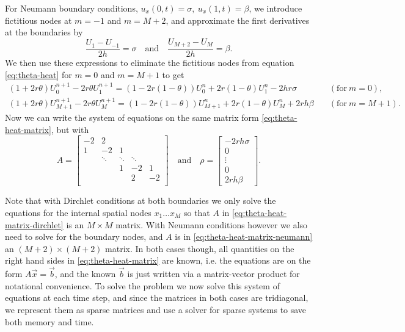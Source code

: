 For Neumann boundary conditions, $u_x(0, t) = \sigma, \: u_x(1, t) = \beta$, 
we introduce fictitious nodes at $m=-1$ and $m=M+2$, 
and approximate the first derivatives at the boundaries by
\begin{equation*}
    \frac{U_1 - U_{-1}}{2h} = \sigma
    \quad \text{and} \quad
    \frac{U_{M+2} - U_{M}}{2h} = \beta. 
\end{equation*}
We then use these expressions to eliminate the fictitious nodes from equation \eqref{eq:theta-heat} for $m=0$ and $m=M+1$ to get
\begin{align*}
    \left(1+2r\theta\right)U_0^{n+1} - 2r\theta U_1^{n+1} = \left(1-2r(1-\theta)\right)U_0^n + 2r\left(1-\theta\right)U_1^n - 2hr\sigma
    \quad & (\text{for} \: m=0), \\
    \left(1+2r\theta\right)U_{M+1}^{n+1} - 2r\theta U_M^{n+1} = \left(1-2r(1-\theta)\right)U_{M+1}^n + 2r\left(1-\theta\right)U_M^n + 2rh\beta
    \quad & (\text{for} \: m=M+1). 
\end{align*}
Now we can write the system of equations on the same matrix form \eqref{eq:theta-heat-matrix}, 
but with 
\begin{equation}
    A = 
    \begin{bmatrix}
    -2 & 2 \\
    1 & -2 & 1 & \\
      & \ddots & \ddots & \ddots & \\
      &   & 1 & -2 & 1 \\
      &   &  & 2 & -2 \\
    \end{bmatrix}
    \quad \text{and} \quad
    \rho = 
    \begin{bmatrix}
        -2rh\sigma \\ 0 \\ \vdots \\ 0 \\ 2rh\beta
    \end{bmatrix}
    .
    \label{eq:theta-heat-matrix-neumann}
\end{equation}

Note that with Dirchlet conditions at both boundaries we only solve the equations for the internal spatial nodes $x_1 \dots x_M$ so that $A$ in \eqref{eq:theta-heat-matrix-dirchlet} is an $M \times M$ matrix. 
With Neumann conditions however we also need to solve for the boundary nodes, 
and $A$ is in \eqref{eq:theta-heat-matrix-neumann} an $(M+2) \times (M+2)$ matrix. 
In both cases though, all quantities on the right hand sides in \eqref{eq:theta-heat-matrix} are known, 
i.e. the equations are on the form $A\vec{x}=\vec{b}$, 
and the known $\vec{b}$ is just written via a matrix-vector product for notational convenience. 
To solve the problem we now solve this system of equations at each time step, 
and since the matrices in both cases are tridiagonal, 
we represent them as sparse matrices and use a solver for sparse systems to save both memory and time. 


